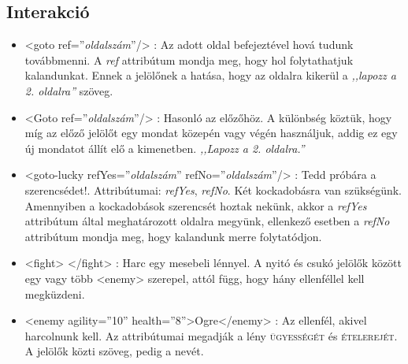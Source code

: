 \documentclass[12pt,a4paper,oneside]{report}
\newcommand{\xtag}[1]{{\color{Tag}#1}}
\newcommand{\xattr}[2]{{\color{Attr}#1}={\color{Value}''#2''}}
\newcommand{\stat}{\textsc}
\newcommand{\attr}{\emph}
\begin{document}
            
    \subsection{Interakció}
      \begin{itemize}
        \item <\xtag{goto} \xattr{ref}{\emph{oldalszám}}/>          
          : Az adott oldal befejeztével hová tudunk továbbmenni. A
          \attr{ref} attribútum mondja meg, hogy hol folytathatjuk
          kalandunkat. Ennek a jelölőnek a hatása, hogy az oldalra
          kikerül a \emph{,,lapozz a 2. oldalra''} szöveg.
    
        \item <\xtag{Goto} \xattr{ref}{\emph{oldalszám}}/>          
          : Hasonló az előzőhöz. A különbség köztük, hogy míg az
          előző jelölőt egy mondat közepén vagy végén használjuk,
          addig ez egy új mondatot állít elő a
          kimenetben. \emph{,,Lapozz a 2. oldalra.''}
    
        \item <\xtag{goto-lucky} \xattr{refYes}{\emph{oldalszám}} \xattr{refNo}{\emph{oldalszám}}/>
          : Tedd próbára a
          szerencsédet!. Attribútumai: \attr{refYes}, \attr{refNo}. Két
          kockadobásra van szükségünk. Amennyiben a kockadobások
          szerencsét hoztak nekünk, akkor a \attr{refYes} attribútum
          által meghatározott oldalra megyünk, ellenkező esetben a
          \attr{refNo} attribútum mondja meg, hogy kalandunk merre
          folytatódjon.

        \item <\xtag{f{}ight}> <\xtag{/f{}ight}> : Harc egy
          mesebeli lénnyel. A nyitó és csukó jelölők között egy vagy
          több <\xtag{enemy}> szerepel, attól függ, hogy hány ellenféllel
          kell megküzdeni.
        \item <\xtag{enemy} \xattr{agility}{10} \xattr{health}{8}>Ogre<\xtag{/enemy}>
          : Az ellenfél, akivel harcolnunk kell. Az attribútumai
          megadják a lény \stat{ügyességét} és \stat{ételerejét}. A
          jelölők közti szöveg, pedig a nevét.
      \end{itemize}
      
\end{document}

